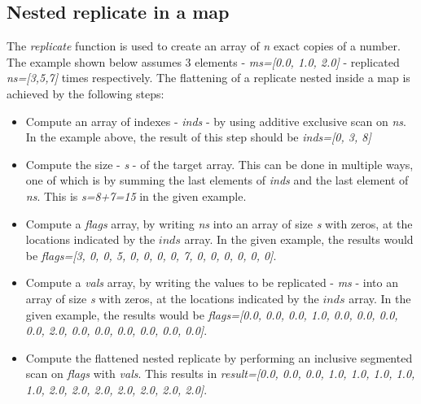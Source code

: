 \subsection{Nested replicate in a map}
\label{chapter:section:flattening:replicate}
The \textit{replicate} function is used to create an array of \textit{n} exact copies of a number. The example shown below assumes 3 elements - \textit{ms=[0.0, 1.0, 2.0]} - replicated \textit{ns=[3,5,7]} times respectively. The flattening of a replicate nested inside a map is achieved by the following steps:
\begin{itemize}
    \item Compute an array of indexes - \textit{inds} - by using additive exclusive scan on \textit{ns}. In the example above, the result of this step should be \textit{inds=[0, 3, 8]}
    
    \item Compute the size - \textit{s} - of the target array. This can be done in multiple ways, one of which is by summing the last elements of \textit{inds} and the last element of \textit{ns}. This is \textit{s=8+7=15} in the given example.
    
    \item Compute a \textit{flags} array, by writing \textit{ns} into an array of size \textit{s} with zeros, at the locations indicated by the $\mathit{inds}$ array. In the given example, the results would be \textit{flags=[3, 0, 0, 5, 0, 0, 0, 0, 7, 0, 0, 0, 0, 0, 0]}. 
    
    \item Compute a \textit{vals} array, by writing the values to be replicated - \textit{ms} - into an array of size \textit{s} with zeros, at the locations indicated by the $\mathit{inds}$ array. In the given example, the results would be \textit{flags=[0.0, 0.0, 0.0, 1.0, 0.0, 0.0, 0.0, 0.0, 2.0, 0.0, 0.0, 0.0, 0.0, 0.0, 0.0]}. 
    
    \item Compute the flattened nested replicate by performing an inclusive segmented scan on \textit{flags} with \textit{vals}. This results in \textit{result=[0.0, 0.0, 0.0, 1.0, 1.0, 1.0, 1.0, 1.0, 2.0, 2.0, 2.0, 2.0, 2.0, 2.0, 2.0]}.
\end{itemize}
\newpage
